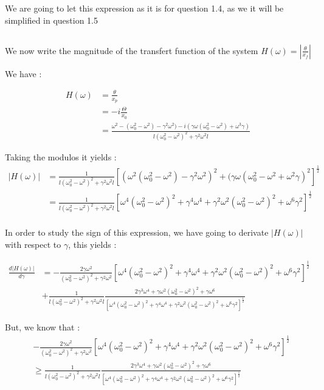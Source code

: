 \documentclass{article}
\begin{document}
We are going to let this expression as it is for question 1.4, as we it will be simplified in question 1.5

\subsection{} %

We now write the magnitude of the transfert function of the system $H(\omega) = \left|\frac{\theta}{x_f}\right|$

We have : 

\begin{align*}
H(\omega) &= \frac{\theta}{x_p}\\
&= -i\frac{\Theta}{x_0}\\
&= \frac{\omega^2-(\omega_0^2 -\omega^2) - \gamma^2\omega^2) - i(\gamma \omega(\omega_0^2-\omega^2)+ \omega^3\gamma)}{l(\omega_0^2 - \omega^2)^2 + \gamma^2\omega^2l} 
\end{align*}

Taking the modulos it yields : 
\begin{align*}
\left|H(\omega)\right| &= \frac{1}{l(\omega_0^2-\omega^2)^2+\gamma^2\omega^2l}\left[(\omega^2(\omega_0^2-\omega^2)-\gamma^2\omega^2)^2 + (\gamma\omega(\omega_0^2-\omega^2+\omega^2\gamma)^2\right]^{\frac{1}{2}} \\
&= \frac{1}{l(\omega_0^2-\omega^2)^2+\gamma^2\omega^2l}\left[\omega^4(\omega_0^2-\omega^2)^2+\gamma^4\omega^4+\gamma^2\omega^2(\omega_0^2-\omega^2)^2+\omega^6\gamma^2\right]^{\frac{1}{2}} \\
\end{align*}

In order to study the sign of this expression, we have going to derivate $\left|H(\omega)\right|$ with respect to $\gamma$, this yields :

\begin{align*}
\frac{d\left|H(\omega)\right|}{d\gamma} &= -\frac{2\gamma \omega^2}{(\omega_0^2-\omega^2)^2 + \gamma^2\omega^2}\left[\omega^4(\omega_0^2-\omega^2)^2+\gamma^4\omega^4+\gamma^2\omega^2(\omega_0^2-\omega^2)^2+\omega^6\gamma^2\right]^{\frac{1}{2}}\\ &+ \frac{1}{l(\omega_0^2-\omega^2)^2+\gamma^2\omega^2l}\frac{2\gamma^3\omega^4+\gamma \omega^2(\omega_0^2-\omega^2)^2+\gamma \omega^6}{\left[\omega^4(\omega_0^2-\omega^2)^2+\gamma^4\omega^4+\gamma^2\omega^2(\omega_0^2-\omega^2)^2+\omega^6\gamma^2\right]^{\frac{1}{2}}}
\end{align*}


But, we know that :
\begin{align*}
 & -\frac{2\gamma \omega^2}{(\omega_0^2-\omega^2)^2 + \gamma^2\omega^2}\left[\omega^4(\omega_0^2-\omega^2)^2+\gamma^4\omega^4+\gamma^2\omega^2(\omega_0^2-\omega^2)^2+\omega^6\gamma^2\right]^{\frac{1}{2}}\\
&\ge  \frac{1}{l(\omega_0^2-\omega^2)^2+\gamma^2\omega^2l}\frac{2\gamma^3\omega^4+\gamma \omega^2(\omega_0^2-\omega^2)^2+\gamma \omega^6}{\left[\omega^4(\omega_0^2-\omega^2)^2+\gamma^4\omega^4+\gamma^2\omega^2(\omega_0^2-\omega^2)^2+\omega^6\gamma^2\right]^{\frac{1}{2}}}
\end{align*}
\end{document}
